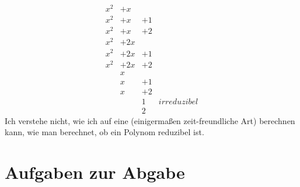 \documentclass{article} %
\begin{document}
\begin{enumerate}
\begin{mybox}
\[\begin{array}{cccc}
        x^2 & + x & \\ 
        x^2 & + x & + 1 \\ 
        x^2 & + x & + 2 \\ 
        x^2 & + 2x &  \\ 
        x^2 & + 2x & + 1 \\ 
        x^2 & + 2x & + 2 \\
        & x \\
        &  x & + 1 \\
        & x & +2 \\
        & & 1 & irreduzibel\\
        & & 2
       \end{array}
       \]
       Ich verstehe nicht, wie ich auf eine (einigermaßen zeit-freundliche Art) berechnen kann, wie man berechnet, ob ein Polynom reduzibel ist. 
        \end{mybox}
\end{enumerate}


\section*{Aufgaben zur Abgabe}
\end{document}
